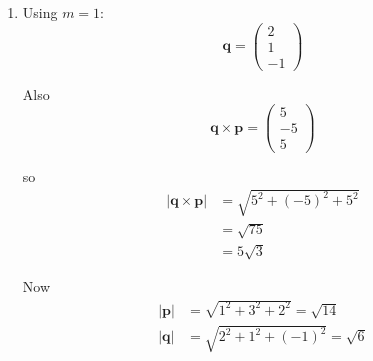 \documentclass[leqno]{article}
\begin{document}
\begin{enumerate}[
  label=\textbf{\arabic*.},
  leftmargin=*,
  topsep=0pt,
  partopsep=0pt,
  parsep=0pt
]
\begin{djsSolution}
\begin{enumerate}[label=\textbf{(\alph*)}]
Since $\mathbf q\times \mathbf p$ is in the same direction as
\[
\mathbf n=\begin{pmatrix}1\\-1\\1\end{pmatrix}
\]

we can write
\[
\mathbf q\times \mathbf p=\lambda \mathbf n
=
\begin{pmatrix}
\lambda\\
-\lambda\\
\lambda
\end{pmatrix}
\]

So
\[
\begin{pmatrix}
2m+3\\
-5\\
6-m
\end{pmatrix}
=
\begin{pmatrix}
\lambda\\
-\lambda\\
\lambda
\end{pmatrix}
\]

Equating components:
\[
-5=-\lambda\quad\Longrightarrow\quad\lambda=5
\]

Then
\[
2m+3=5\quad\Longrightarrow\quad 2m=2\quad\Longrightarrow\quad m=1
\]

Hence
\[
m=1,\qquad \lambda=5
\]

  \item Using $m=1$:
\[
\mathbf q=\begin{pmatrix}2\\1\\-1\end{pmatrix}
\]

Also
\[
\mathbf q\times \mathbf p=\begin{pmatrix}5\\-5\\5\end{pmatrix}
\]

so
\begin{align*}
|\mathbf q\times \mathbf p|
&=\sqrt{5^2+(-5)^2+5^2} \\
&=\sqrt{75} \\
&=5\sqrt3
\end{align*}

Now
\begin{align*}
|\mathbf p|&=\sqrt{1^2+3^2+2^2}=\sqrt{14} \\
|\mathbf q|&=\sqrt{2^2+1^2+(-1)^2}=\sqrt6
\end{align*}


\end{enumerate}
\end{djsSolution}
\end{enumerate}
\end{document}
